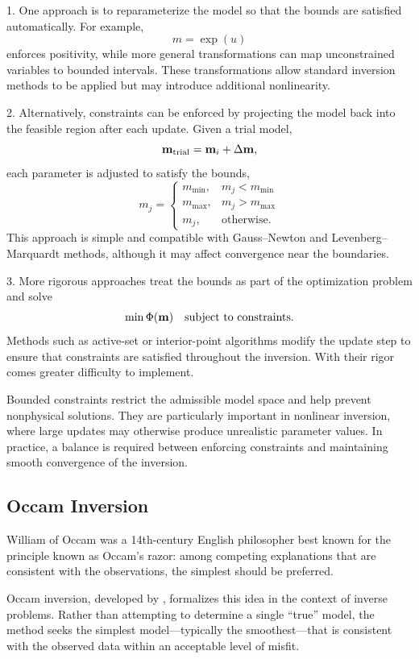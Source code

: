 1.\; One approach is to reparameterize the model so that the bounds are satisfied automatically. For example,
\[
    m = \exp(u)
\]
enforces positivity, while more general transformations can map unconstrained variables to bounded intervals. These transformations allow standard inversion methods to be applied but may introduce additional nonlinearity.

2.\; Alternatively, constraints can be enforced by projecting the model back into the feasible region after each update. Given a trial model,
\[
    \vb{m}_{\text{trial}} = \vb{m}_i + \Delta \vb{m},
\]
each parameter is adjusted to satisfy the bounds,
\[
    m_j =
    \begin{cases}
        m_{\min}, & m_j < m_{\min} \\
        m_{\max}, & m_j > m_{\max} \\
        m_j, & \text{otherwise}.
    \end{cases}
\]
This approach is simple and compatible with Gauss--Newton and Levenberg--Marquardt methods, although it may affect convergence near the boundaries.

3.\; More rigorous approaches treat the bounds as part of the optimization problem and solve
\[
    \min \Phi(\vb{m}) \quad \text{subject to constraints}.
\]
Methods such as active-set or interior-point algorithms modify the update step to ensure that constraints are satisfied throughout the inversion. With their rigor comes greater difficulty to implement.

Bounded constraints restrict the admissible model space and help prevent nonphysical solutions. They are particularly important in nonlinear inversion, where large updates may otherwise produce unrealistic parameter values. In practice, a balance is required between enforcing constraints and maintaining smooth convergence of the inversion.

\subsection{Occam Inversion}\label{sec:occam}

William of Occam was a 14th-century English philosopher best known for the principle known as Occam's razor: among competing explanations that are consistent with the observations, the simplest should be preferred.

Occam inversion, developed by \citet{Constable_etal1987}, formalizes this idea in the context of inverse problems. Rather than attempting to determine a single ``true'' model, the method seeks the simplest model—typically the smoothest—that is consistent with the observed data within an acceptable level of misfit.

